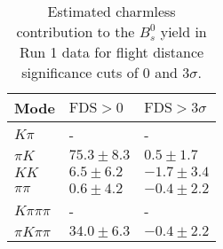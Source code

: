 \begin{table}
  \centering
  \begin{tabular}{lll}
      \toprule
      Mode & $\mathrm{FDS} > 0$ & $\mathrm{FDS} > 3\sigma$ \\
      \midrule
      $K\pi$ & \-- & \-- \\
      $\pi K$ & $75.3 \pm 8.3$ & $0.5 \pm 1.7$ \\
      $KK$ & $6.5 \pm 6.2$ & $-1.7 \pm 3.4$ \\
      $\pi\pi$ & $0.6 \pm 4.2$ & $-0.4 \pm 2.2$ \\
      $K\pi\pi\pi$ & \-- & \-- \\
      $\pi K\pi\pi$ & $34.0 \pm 6.3$ & $-0.4 \pm 2.2$ \\
      \bottomrule
  \end{tabular}
  \caption{\small Estimated charmless contribution to the $B^{0}_{s}$ yield in Run 1 data for flight distance significance cuts of 0  and $3\sigma$.}
\label{tab:charmless_yields_Bs_run_1}
\end{table}
